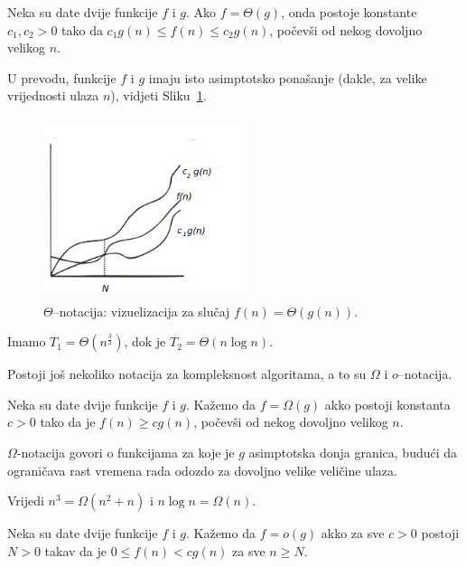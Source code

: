 \begin{definition}
Neka su date dvije funkcije $f$ i $g$.  Ako $f = \Theta(g)$, onda postoje konstante $c_1, c_2 >0$ tako da $c_1 g(n) \leq f(n) \leq c_2 g(n)$, počevši od nekog dovoljno velikog $n$. 
\end{definition}

U prevodu, funkcije $f$ i $g$ imaju isto asimptotsko ponašanje (dakle, za velike vrijednosti ulaza $n$), vidjeti Sliku~\ref{fig:theta_notation}. 

\begin{figure}[H]
	\centering
	\includegraphics[width=170pt,height=150pt]{slike/theta-notation.png}
 
	\caption{$\Theta$--notacija: vizuelizacija za slučaj $f(n)=\Theta(g(n))$.}	\label{fig:theta_notation}
\end{figure}

\begin{example}
Imamo	$T_1 = \Theta(n^{\frac{3}{2}})$, dok je $T_2 = \Theta(n \log n)$.  
\end{example}

Postoji još nekoliko notacija za kompleksnost algoritama, a to su $\Omega$ i $o$--notacija.

\begin{definition}
 Neka su date dvije funkcije $f$ i $g$. Kažemo da $f = \Omega(g)$ akko postoji konstanta $c >0$ tako da je $f(n) \geq c g(n)$, počevši od nekog dovoljno velikog $n$.  
\end{definition}
$\Omega$-notacija govori o funkcijama za koje je $g$ asimptotska donja granica, budući da ograničava rast vremena rada odozdo za dovoljno velike veličine ulaza.

\begin{example}
  Vrijedi $n^3= \Omega(n^2 + n)$ i $n\log n = \Omega(n)$.
\end{example}

\begin{definition}
	Neka su date dvije funkcije $f$ i $g$. Kažemo da $f = o(g)$ akko za sve $c > 0$ postoji   $N > 0$ takav da je $0 \leq f(n) < cg(n)$ za sve $n \geq N$. 
	
\end{definition}

